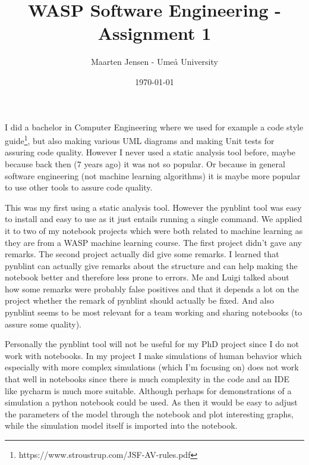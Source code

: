 \documentclass[11pt]{article}
\title{WASP Software Engineering - Assignment 1}
\date{\today}
\author{Maarten Jensen - Ume{\aa} University}
\begin{document}
\maketitle

I did a bachelor in Computer Engineering where we used for example a code style guide\footnote{https://www.stroustrup.com/JSF-AV-rules.pdf}, but also making various UML diagrams and making Unit tests for assuring code quality. However I never used a static analysis tool before, maybe because back then (7 years ago) it was not so popular. Or because in general software engineering (not machine learning algorithms) it is maybe more popular to use other tools to assure code quality.

This was my first using a static analysis tool. However the pynblint tool was easy to install and easy to use as it just entails running a single command. We applied it to two of my notebook projects which were both related to machine learning as they are from a WASP machine learning course. The first project didn't gave any remarks. The second project actually did give some remarks. I learned that pynblint can actually give remarks about the structure and can help making the notebook better and therefore less prone to errors. Me and Luigi talked about how some remarks were probably false positives and that it depends a lot on the project whether the remark of pynblint should actually be fixed. And also pynblint seems to be most relevant for a team working and sharing notebooks (to assure some quality).


Personally the pynblint tool will not be useful for my PhD project since I do not work with notebooks. In my project I make simulations of human behavior which especially with more complex simulations (which I'm focusing on) does not work that well in notebooks since there is much complexity in the code and an IDE like pycharm is much more suitable. Although perhaps for demonstrations of a simulation a python notebook could be used. As then it would be easy to adjust the parameters of the model through the notebook and plot interesting graphs, while the simulation model itself is imported into the notebook.
\end{document}
